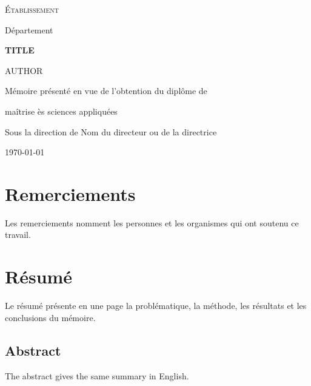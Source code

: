 \documentclass[12pt, openany]{report}
\begin{document}
\begin{titlepage}
  \centering
  {\large\scshape Établissement \par}
  {\large Département \par}
  \vspace{3cm}
  {\huge\bfseries {{TITLE}} \par}
  \vspace{2cm}
  {\Large {{AUTHOR}} \par}
  \vspace{2cm}
  Mémoire présenté en vue de l'obtention du diplôme de \par
  maîtrise ès sciences appliquées \par
  \vspace{1cm}
  Sous la direction de Nom du directeur ou de la directrice \par
  \vfill
  {\large \today \par}
\end{titlepage}

\chapter*{Remerciements}

Les remerciements nomment les personnes et les organismes qui ont soutenu ce
travail.

\chapter*{Résumé}

Le résumé présente en une page la problématique, la méthode, les résultats
et les conclusions du mémoire.

\begin{otherlanguage}{english}
\chapter*{Abstract}

The abstract gives the same summary in English.
\end{otherlanguage}

\tableofcontents
\listoffigures
\listoftables

\cleardoublepage
{}





\printbibliography[heading=bibintoc]

\appendix

\end{document}
